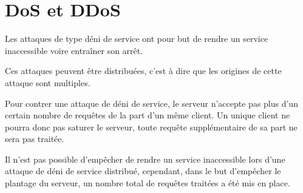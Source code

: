 \clearpage

\section{DoS et DDoS}

Les attaques de type déni de service ont pour but de rendre un service inaccessible voire entraîner son arrêt.

Ces attaques peuvent être distribuées, c'est à dire que les origines de cette attaque sont multiples.

Pour contrer une attaque de déni de service, le serveur n'accepte pas plus d'un certain nombre de requêtes de la part d'un même client. Un unique client ne pourra donc pas saturer le serveur, toute requête supplémentaire de sa part ne sera pas traitée.

Il n'est pas possible d'empêcher de rendre un service inaccessible lors d'une attaque de déni de service distribué, cependant, dans le but d'empêcher le plantage du serveur, un nombre total de requêtes traitées a été mis en place.
